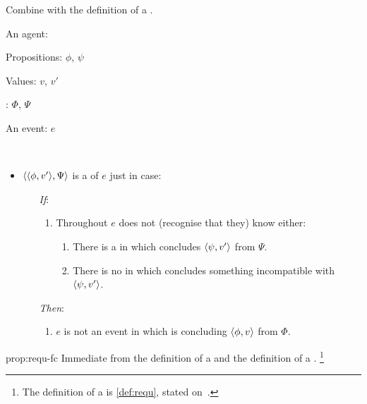 \begin{note}
  Combine with the definition of a \fc{}.

  \begin{proposition}
    \label{prop:requ-fc}
    \begin{itemize*}[noitemsep, label=\(\circ\)]
    \item
      An agent: \vAgent{}
    \item
      Propositions: \(\phi\), \(\psi\)
    \item
      Values: \(v\), \(v'\)
    \item
      : \(\Phi\), \(\Psi\)
    \item
      An event: \(e\)
    \item
      \mbox{ }
    \end{itemize*}

    \begin{itemize}
    \item
      \(\langle \langle \phi, v' \rangle, \Psi \rangle\) is a \emph{\requ{}} of \(e\) just in case:
      \begin{itemize}
      \item[\emph{If}:]
        \begin{enumerate}[label=\alph*., ref=(\alph*), series=requDefSeries]
        \item
          \label{prop:requ-fc:nk}
          Throughout \(e\) \vAgent{} does not (recognise that they) know either:
          \begin{enumerate}[label=\roman*., ref=(\roman*)]
          \item
            \label{prop:requ-fc:nk:psi}
            There is a \pevent{} in which \vAgent{} concludes \(\langle \psi, v' \rangle\) from \(\Psi\).
          \item
            \label{prop:requ-fc:nk:no-conf}
            There is no \pevent{} in which \vAgent{} concludes something incompatible with \(\langle \psi, v' \rangle\).
          \end{enumerate}
        \end{enumerate}
      \item[\emph{Then}:]
        \begin{enumerate}[label=\alph*., ref=(\alph*), resume*=requDefSeries]
        \item
          \label{prop:requ-fc:ne}
          \(e\) is not an event in which \vAgent{} is concluding \(\langle \phi, v \rangle\) from \(\Phi\).
        \end{enumerate}
      \end{itemize}
    \end{itemize}
    \vspace{-\baselineskip}
  \end{proposition}

  \begin{argument}{prop:requ-fc}
    Immediate from the definition of a \requ{} and the definition of a \fc{}.%
    \footnote{
      The definition of a \fc{} is \autoref{def:requ}, stated on~.
    }
  \end{argument}
\end{note}

